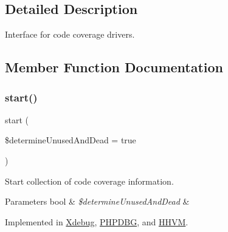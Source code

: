\subsection{Detailed Description}
Interface for code coverage drivers. 

\subsection{Member Function Documentation}
\mbox{\label{interface_sebastian_bergmann_1_1_code_coverage_1_1_driver_1_1_driver_aa3dfff26cb483c3eadbf2418e1729671}} 
\subsubsection{\texorpdfstring{start()}{start()}}
{\footnotesize\ttfamily start (\begin{DoxyParamCaption}\item[{}]{\$determine\+Unused\+And\+Dead = {\ttfamily true} }\end{DoxyParamCaption})}

Start collection of code coverage information.


\begin{DoxyParams}[1]{Parameters}
bool & {\em \$determine\+Unused\+And\+Dead} & \\
\hline
\end{DoxyParams}


Implemented in \mbox{\hyperlink{class_sebastian_bergmann_1_1_code_coverage_1_1_driver_1_1_xdebug_aa3dfff26cb483c3eadbf2418e1729671}{Xdebug}}, \mbox{\hyperlink{class_sebastian_bergmann_1_1_code_coverage_1_1_driver_1_1_p_h_p_d_b_g_aa3dfff26cb483c3eadbf2418e1729671}{P\+H\+P\+D\+BG}}, and \mbox{\hyperlink{class_sebastian_bergmann_1_1_code_coverage_1_1_driver_1_1_h_h_v_m_aa3dfff26cb483c3eadbf2418e1729671}{H\+H\+VM}}.

\mbox{\label{interface_sebastian_bergmann_1_1_code_coverage_1_1_driver_1_1_driver_a8b6fc76a620d7557d06e9a11a9ffb509}} 
